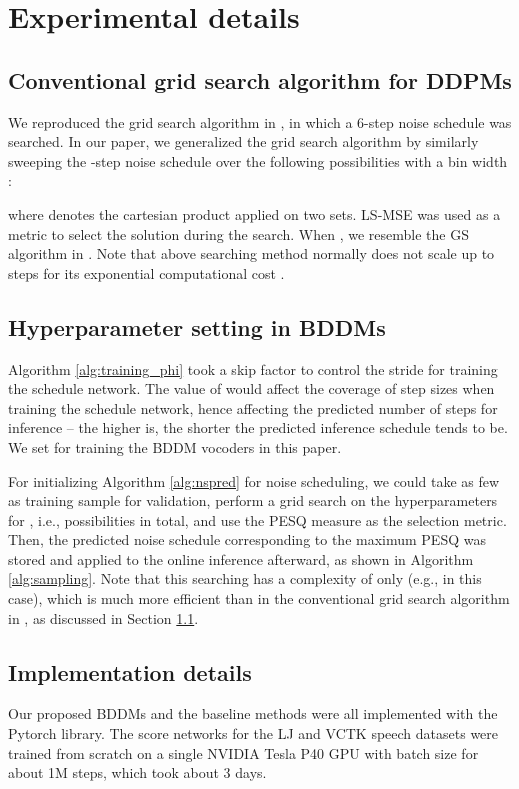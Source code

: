 \section{Experimental details}
\label{appendix:B}
\subsection{Conventional grid search algorithm for DDPMs}
\label{sec:gridsearch}
We reproduced the grid search algorithm in \citep{nanxin2020}, in which a 6-step noise schedule was searched. In our paper, we generalized the grid search algorithm by similarly sweeping the -step noise schedule over the following possibilities with a bin width :

where  denotes the cartesian product applied on two sets. LS-MSE was used as a metric to select the solution during the search. When , we resemble the GS algorithm in \citep{nanxin2020}. Note that above searching method normally does not scale up to  steps for its exponential computational cost .

\subsection{Hyperparameter setting in BDDMs}
Algorithm \ref{alg:training_phi} took a skip factor  to control the stride for training the schedule network. The value of  would affect the coverage of step sizes when training the schedule network, hence affecting the predicted number of steps  for inference -- the higher  is, the shorter the predicted inference schedule tends to be. We set  for training the BDDM vocoders in this paper.

For initializing Algorithm \ref{alg:nspred} for noise scheduling, we could take as few as  training sample for validation, perform a grid search on the hyperparameters  for , i.e.,  possibilities in total, and use the PESQ measure as the selection metric. Then, the predicted noise schedule corresponding to the maximum PESQ was stored and applied to the online inference afterward, as shown in Algorithm \ref{alg:sampling}. Note that this searching has a complexity of only  (e.g.,  in this case), which is much more efficient than  in the conventional grid search algorithm in \citep{nanxin2020}, as discussed in Section \ref{sec:gridsearch}.




\subsection{Implementation details}
Our proposed BDDMs and the baseline methods were all implemented with the Pytorch library. The score networks for the LJ and VCTK speech datasets were trained from scratch on a single NVIDIA Tesla P40 GPU with batch size  for about 1M steps, which took about 3 days.

